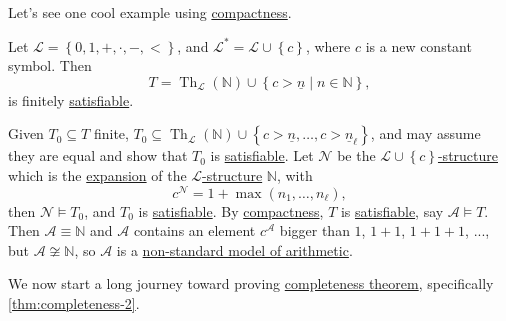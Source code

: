 Let's see one cool example using \hyperref[thm:compactness]{compactness}.

\begin{eg}\label{eg:construction-non-standard-model-of-arithmetic}
	Let \(\mathcal{L} = \left\{ 0, 1, +, \cdot, -, < \right\} \), and \(\mathcal{L} ^{\ast} = \mathcal{L} \cup \left\{ c \right\} \), where \(c\) is a new constant symbol. Then
	\[
		T = \mathop{\mathrm{Th}}\nolimits_{\mathcal{L} }(\mathbb{N} ) \cup \left\{ c > \underline{n} \mid n \in \mathbb{N}  \right\} ,
	\]
	is finitely \hyperref[def:satisfiable]{satisfiable}.
\end{eg}
\begin{explanation}
	Given \(T_0 \subseteq T\) finite, \(T_0 \subseteq \mathop{\mathrm{Th}}\nolimits_{\mathcal{L} }(\mathbb{N} ) \cup \left\{ c> \underline{n}, \dots , c>\underline{n}_{\ell }  \right\} \), and may assume they are equal and show that \(T_0\) is \hyperref[def:satisfiable]{satisfiable}. Let \(\mathcal{N} \) be the \hyperref[def:structure]{\(\mathcal{L} \cup \left\{ c \right\} \)-structure} which is the \hyperref[not:expansion]{expansion} of the \hyperref[def:structure]{\(\mathcal{L} \)-structure} \(\mathbb{N} \), with
	\[
		c^{\mathcal{N} }  = 1 + \max (n_1, \dots , n_{\ell } ),
	\]
	then \(\mathcal{N} \models T_0\), and \(T_0\) is \hyperref[def:satisfiable]{satisfiable}. By \hyperref[thm:compactness]{compactness}, \(T\) is \hyperref[def:satisfiable]{satisfiable}, say \(\mathcal{A} \models T\). Then \(\mathcal{A} \equiv \mathbb{N} \) and \(\mathcal{A} \) contains an element \(c^{\mathcal{A} } \) bigger than \(1\), \(1+1\), \(1+1+1\), ..., but \(\mathcal{A} \not \cong \mathbb{N} \), so \(\mathcal{A} \) is a \hyperref[rmk:non-standard-model-of-arithmetic]{non-standard model of arithmetic}.
\end{explanation}

We now start a long journey toward proving \hyperref[thm:completeness]{completeness theorem}, specifically \autoref{thm:completeness-2}.